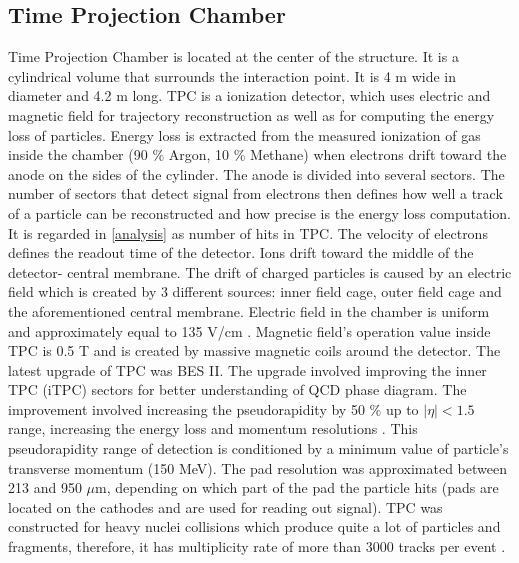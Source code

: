 \subsection{Time Projection Chamber}
\label{tpc}
Time Projection Chamber is located at the center of the structure. It is a cylindrical volume that surrounds the interaction point. It is 4 m wide in diameter and 4.2 m long. TPC is a ionization detector, which uses electric and magnetic field for trajectory reconstruction as well as for computing the energy loss of particles. Energy loss is extracted from the measured ionization of gas inside the chamber (90 $\%$ Argon, 10 $\%$ Methane) when electrons drift toward the anode on the sides of the cylinder. The anode is divided into several sectors. The number of sectors that detect signal from electrons then defines how well a track of a particle can be reconstructed and how precise is the energy loss computation. It is regarded in \autoref{analysis} as number of hits in TPC. The velocity of electrons defines the readout time of the detector. Ions drift toward the middle of the detector- central membrane. The drift of charged particles is caused by an electric field which is created by 3 different sources: inner field cage, outer field cage and the aforementioned central membrane\cite{STAR}. Electric field in the chamber is uniform and approximately equal to 135 V/cm \cite{TPC}. Magnetic field's operation value inside TPC is 0.5 T and is created by massive magnetic coils around the detector. The latest upgrade of TPC was BES II. The upgrade involved improving the inner TPC (iTPC) sectors for better understanding of QCD phase diagram. The improvement involved increasing the pseudorapidity by 50 $\%$ up to $|\eta|<1.5$ range, increasing the energy loss and momentum resolutions \cite{TPCupgrade}. This pseudorapidity range of detection is conditioned by a minimum value of particle's transverse momentum (150 MeV). The pad resolution was approximated between 213 and 950 $\mu$m, depending on which part of the pad the particle hits\cite{STAR} (pads are located on the cathodes and are used for reading out signal). TPC was constructed for heavy nuclei collisions which produce quite a lot of particles and fragments, therefore, it has multiplicity rate of more than 3000 tracks per event \cite{TPC}.

